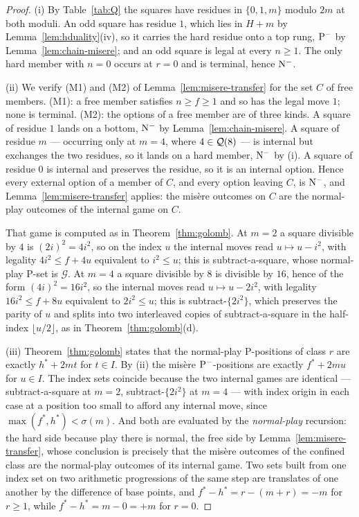\begin{proof}
(i) By Table~\ref{tab:Q} the squares have residues in $\{0, 1, m\}$
modulo $2m$ at both moduli. An odd square has residue $1$, which lies in
$H + m$ by Lemma~\ref{lem:hduality}(iv), so it carries the hard residue
onto a top rung, $\mathrm{P}^-$ by Lemma~\ref{lem:chain-misere}; and an odd
square is legal at every $n \ge 1$. The only hard member with $n = 0$
occurs at $r = 0$ and is terminal, hence $\mathrm{N}^-$.

(ii) We verify (M1) and (M2) of Lemma~\ref{lem:misere-transfer} for the
set $C$ of free members. (M1): a free member satisfies $n \ge f \ge 1$
and so has the legal move $1$; none is terminal. (M2): the options of a
free member are of three kinds. A square of residue $1$ lands on a
bottom, $\mathrm{N}^-$ by Lemma~\ref{lem:chain-misere}. A square of residue $m$
--- occurring only at $m = 4$, where $4 \in \mathcal{Q}(8)$ --- is internal but
exchanges the two residues, so it lands on a hard member, $\mathrm{N}^-$ by (i).
A square of residue $0$ is internal and preserves the residue, so it is
an internal option. Hence every external option of a member of $C$, and
every option leaving $C$, is $\mathrm{N}^-$, and
Lemma~\ref{lem:misere-transfer} applies: the mis\`ere outcomes on $C$ are
the normal-play outcomes of the internal game on $C$.

That game is computed as in Theorem~\ref{thm:golomb}. At $m = 2$ a square
divisible by $4$ is $(2i)^2 = 4i^2$, so on the index $u$ the internal
moves read $u \mapsto u - i^2$, with legality $4i^2 \le f + 4u$
equivalent to $i^2 \le u$; this is subtract-a-square, whose normal-play
P-set is $\mathcal{G}$. At $m = 4$ a square divisible by $8$ is divisible
by $16$, hence of the form $(4i)^2 = 16i^2$, so the internal moves read
$u \mapsto u - 2i^2$, with legality $16i^2 \le f + 8u$ equivalent to
$2i^2 \le u$; this is subtract-$\{2i^2\}$, which preserves the parity of
$u$ and splits into two interleaved copies of subtract-a-square in the
half-index $\lfloor u/2 \rfloor$, as in
Theorem~\ref{thm:golomb}(d).

(iii) Theorem~\ref{thm:golomb} states that the normal-play P-positions of
class $r$ are exactly $h^* + 2mt$ for $t \in I$. By (ii) the mis\`ere
$\mathrm{P}^-$-positions are exactly $f^* + 2mu$ for $u \in I$. The index sets
coincide because the two internal games are identical ---
subtract-a-square at $m = 2$, subtract-$\{2i^2\}$ at $m = 4$ --- with
index origin in each case at a position too small to afford any internal
move, since $\max(f^*, h^*) < \sigma(m)$. And both are evaluated by the
\emph{normal-play} recursion: the hard side because play there is normal,
the free side by Lemma~\ref{lem:misere-transfer}, whose conclusion is
precisely that the mis\`ere outcomes of the confined class are the
normal-play outcomes of its internal game. Two sets built from one index
set on two arithmetic progressions of the same step are translates of one
another by the difference of base points, and
$f^* - h^* = r - (m+r) = -m$ for $r \ge 1$, while $f^* - h^* = m - 0 = +m$
for $r = 0$.
\end{proof}

